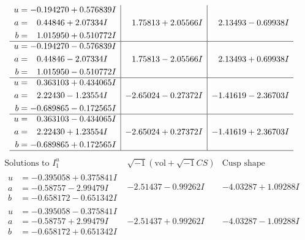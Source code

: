 \documentclass[1p]{elsarticle_modified}
\theoremstyle{definition}
\newcommand{\I}{\sqrt{-1}}
\begin{document}
$$\begin{array}{c|c|c}
\begin{aligned}
u &= -0.194270 + 0.576839 I \\
a &= \phantom{-}0.44846 + 2.07334 I \\
b &= \phantom{-}1.015950 + 0.510772 I\end{aligned}
 & \phantom{-}1.75813 + 2.05566 I & \phantom{-}2.13493 - 0.69938 I \\ \hline\begin{aligned}
u &= -0.194270 - 0.576839 I \\
a &= \phantom{-}0.44846 - 2.07334 I \\
b &= \phantom{-}1.015950 - 0.510772 I\end{aligned}
 & \phantom{-}1.75813 - 2.05566 I & \phantom{-}2.13493 + 0.69938 I \\ \hline\begin{aligned}
u &= \phantom{-}0.363103 + 0.434065 I \\
a &= \phantom{-}2.22430 - 1.23554 I \\
b &= -0.689865 - 0.172565 I\end{aligned}
 & -2.65024 - 0.27372 I & -1.41619 - 2.36703 I \\ \hline\begin{aligned}
u &= \phantom{-}0.363103 - 0.434065 I \\
a &= \phantom{-}2.22430 + 1.23554 I \\
b &= -0.689865 + 0.172565 I\end{aligned}
 & -2.65024 + 0.27372 I & -1.41619 + 2.36703 I\\
 \hline 
 \end{array}$$\newpage$$\begin{array}{c|c|c}  
\text{Solutions to }I^u_{1}& \I (\text{vol} + \sqrt{-1}CS) & \text{Cusp shape}\\
 \hline 
\begin{aligned}
u &= -0.395058 + 0.375841 I \\
a &= -0.58757 - 2.99479 I \\
b &= -0.658172 - 0.651342 I\end{aligned}
 & -2.51437 - 0.99262 I & -4.03287 + 1.09288 I \\ \hline\begin{aligned}
u &= -0.395058 - 0.375841 I \\
a &= -0.58757 + 2.99479 I \\
b &= -0.658172 + 0.651342 I\end{aligned}
 & -2.51437 + 0.99262 I & -4.03287 - 1.09288 I \\ \hline\begin{aligned}

\end{aligned}
\end{array}$$
\end{document}
